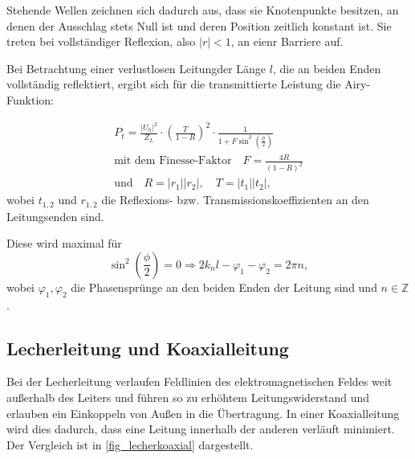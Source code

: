 \documentclass[
	a4paper,
	12pt,
	pagesize,
	ngerman
]{scrartcl}
\begin{document}
	Stehende Wellen zeichnen sich dadurch aus, dass sie Knotenpunkte besitzen, an denen der Ausschlag stets Null ist und deren Position zeitlich konstant ist.
	Sie treten bei vollständiger Reflexion, also $| r | < 1	$, an eienr Barriere auf.

	Bei Betrachtung einer verlustlosen Leitungder Länge $l$, die an beiden Enden vollständig reflektiert, ergibt sich für die transmittierte Leistung die Airy-Funktion:

	\begin{align}
		P_t = \frac{|U_h|^2}{Z_L} \cdot \left( \frac{T}{1-R} \right) ^2 \cdot \frac{1}{1+F \sin^2 \left( \frac{\phi}{2} \right) } \\
		\text{mit dem Finesse-Faktor} \quad F= \frac{4R}{(1-R)^2} \\
		\text{und} \quad R = |r_1 ||r_2 |, \quad T= |t_1||t_2|,
	\end{align}
	wobei $t_{1,2}$ und $r_{1,2}$ die Reflexions- bzw. Transmissionskoeffizienten an den Leitungsenden sind.

	Diese wird maximal für
	\begin{equation}
		\label{eq_inter}
	\sin ^2 \left( \frac{\phi}{2} \right) = 0 \Rightarrow 2k_nl -\varphi_1 - \varphi_2 = 2\pi n,
	\end{equation}
	wobei $\varphi_1, \varphi_2 $ die Phasensprünge an den beiden Enden der Leitung sind und $n \in \mathbb{Z}$.

	\subsection{Lecherleitung und Koaxialleitung}
	Bei der Lecherleitung verlaufen Feldlinien des elektromagnetischen Feldes weit außerhalb des Leiters und führen so zu erhöhtem Leitungswiderstand und erlauben ein Einkoppeln von Außen in die Übertragung.
	In einer Koaxialleitung wird dies dadurch, dass eine Leitung innerhalb der anderen verläuft minimiert.
	Der Vergleich ist in \cref{fig_lecherkoaxial} dargestellt.
\end{document}
